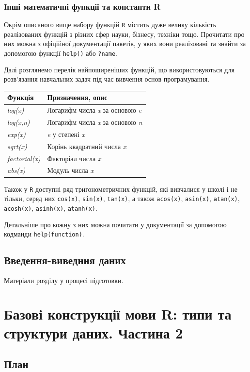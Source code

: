 \documentclass[
]{book}
\begin{document}
\hypertarget{chapter244}{%
\subsection{Інші математичні функції та константи R}\label{chapter244}}

Окрім описаного вище набору функцій \texttt{R} містить дуже велику кількість реалізованих функцій з різних сфер науки, бізнесу, техніки тощо. Прочитати про них можна з офіційної документації пакетів, у яких вони реалізовані та знайти за допомогою функції \texttt{help()} або \texttt{?name}.

Далі розглянемо перелік найпоширеніших функцій, що використовуються для розв'язання навчальних задач під час вивчення основ програмування.

\begin{longtable}[]{@{}ll@{}}
\toprule
Функція & Призначення, опис\tabularnewline
\midrule
\endhead
\emph{log(x)} & Логарифм числа \emph{x} за основою \emph{e}\tabularnewline
\emph{log(x,n)} & Логарифм числа \emph{x} за основою \emph{n}\tabularnewline
\emph{exp(x)} & \emph{e} у степені \emph{x}\tabularnewline
\emph{sqrt(x)} & Корінь квадратний числа \emph{x}\tabularnewline
\emph{factorial(x)} & Факторіал числа \emph{x}\tabularnewline
\emph{abs(x)} & Модуль числа \emph{x}\tabularnewline
\bottomrule
\end{longtable}

Також у \texttt{R} доступні ряд тригонометричних функцій, які вивчалися у школі і не тільки, серед них \texttt{cos(x)}, \texttt{sin(x)}, \texttt{tan(x)}, а також \texttt{acos(x)}, \texttt{asin(x)}, \texttt{atan(x)}, \texttt{acosh(x)}, \texttt{asinh(x)}, \texttt{atanh(x)}.

Детальніше про кожну з них можна почитати у документації за допомогою кодманди \texttt{help(function)}.

\hypertarget{chapter245}{%
\section{Введення-виведння даних}\label{chapter245}}

Матеріали розділу у процесі підготовки.

\hypertarget{chapter3}{%
\chapter{Базові конструкції мови R: типи та структури даних. Частина 2}\label{chapter3}}

\hypertarget{ux43fux43bux430ux43d-2}{%
\section*{План}\label{ux43fux43bux430ux43d-2}}
\end{document}
